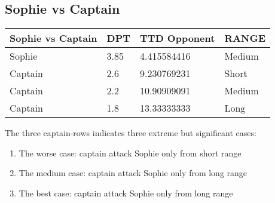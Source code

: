 \subsection{Sophie vs Captain}
\begin{table}[H]
  \centering
\begin{tabular}{|l|l|l|l|}
\hline
\rowcolor[HTML]{C0C0C0} 
\textbf{Sophie vs Captain} & \textbf{DPT} & \textbf{TTD Opponent} & \textbf{RANGE} \\ \hline
Sophie & 3.85 & 4.415584416 & Medium \\ \hline
Captain & 2.6 & 9.230769231 & Short \\ \hline
Captain & 2.2 & 10.90909091 & Medium \\ \hline
Captain & 1.8 & 13.33333333 & Long \\ \hline
\end{tabular}
\end{table}
The three captain-rows indicates three extreme but significant cases:
\begin{enumerate}
\item The worse case: captain attack Sophie only from short range
\item The medium case: captain attack Sophie only  from long range
\item The best case: captain attack Sophie only  from long range
\end{enumerate}
